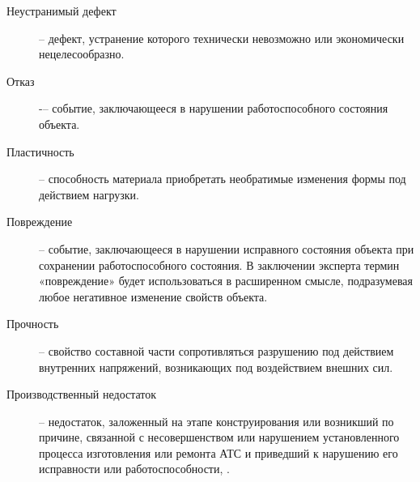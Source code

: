 \begin{description}
	\item
	[Неустранимый дефект] -- дефект, устранение которого технически невозможно или экономически нецелесообразно.
	\item
	[Отказ]  -–  событие, заключающееся в нарушении работоспособного состояния объекта.
	\item
	[Пластичность] --  способность  материала
	приобретать  необратимые  изменения  формы  под действием нагрузки.
	\item  
	[Повреждение] -- событие, заключающееся в нарушении исправного состояния объекта при сохранении работоспособного состояния.
		В заключении эксперта термин «повреждение» будет использоваться в расширенном смысле, подразумевая любое негативное изменение свойств объекта.
\item
[Прочность] -- свойство составной части сопротивляться разрушению под
действием внутренних напряжений, возникающих под воздействием внешних сил. 
\item
[Производственный недостаток]  -- недостаток, заложенный на этапе конструирования или возникший по причине, связанной с несовер­шенством или нарушением установленного процесса изготовления или ремонта АТС и приведший к нарушению его исправности или ра­ботоспособности, \cite{remont:2007}.

\end{description}
